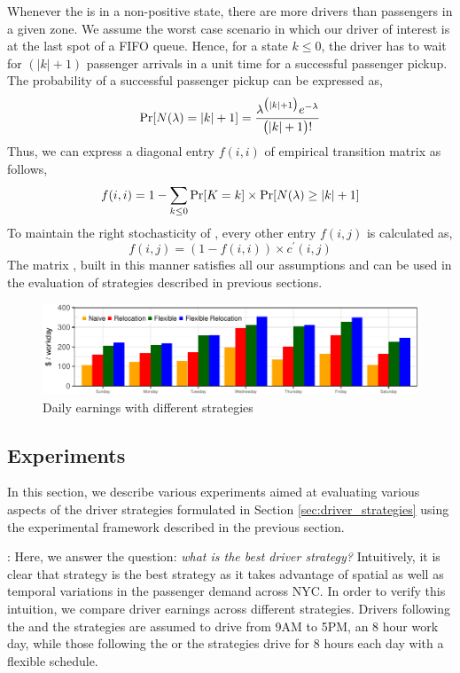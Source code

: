 Whenever the {\markovchain} is in a non-positive state, there are more drivers than passengers in a given zone. We assume the worst case scenario in which our driver of interest is at the last spot of a FIFO queue. Hence, for a state $k \leq 0$, the driver has to wait for $(|k| + 1)$ passenger arrivals in a unit time for a successful passenger pickup. The probability of a successful passenger pickup can be expressed as,
\begin{equation}
\Pr[N(\lambda) = |k| + 1] = \frac{\lambda^{\big(|k|+1\big)} e^{-\lambda}}{\big(|k| + 1\big)!}
\end{equation}
Thus, we can express a diagonal entry $f(i,i)$ of empirical transition matrix as follows,
\begin{equation}
f(i,i) = 1 - \sum_{k \leq 0} \Pr[K = k] \times \Pr[N(\lambda) \geq |k| + 1]
\end{equation}
To maintain the right stochasticity of {\empiricaltransitionmatrix}, every other entry $f(i,j)$ is calculated as,
\begin{equation}
f(i,j) = (1 - f(i,i)) \times c^\prime(i,j)
\end{equation}
The matrix {\empiricaltransitionmatrix}, built in this manner satisfies all our assumptions and can be used in the evaluation of strategies described in previous sections.

\begin{figure}
	\centering
	\includegraphics{figures/daily_earnings.pdf}
	\caption{Daily earnings with different strategies}
	\label{fig:daily_earnings}
\end{figure}

\subsection{Experiments}
In this section, we describe various experiments aimed at evaluating various aspects of the driver strategies formulated in Section \ref{sec:driver_strategies} using the experimental framework described in the previous section.

: Here, we answer the question: \textit{what is the best driver strategy?} Intuitively, it is clear that {\relocationflexible} strategy is the best strategy as it takes advantage of spatial as well as temporal variations in the passenger demand across NYC. In order to verify this intuition, we compare driver earnings across different strategies. Drivers following the {\naive} and the {\relocation} strategies are assumed to drive from 9AM to 5PM, an 8 hour work day, while those following the {\flexible} or the {\relocationflexible} strategies drive for 8 hours each day with a flexible schedule.


